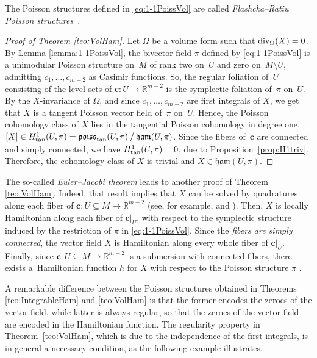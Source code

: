 \documentclass[pdftex]{sigma}%
\newcommand{\R}[1]{\mathbb{R}^{#1}}
\numberwithin{equation}{section}
\begin{document}
\begin{Remark}
The Poisson structures defined in \eqref{eq:1-1PoissVol} are called \emph{Flashcka--Ratiu Poisson structures}~\cite{Damianou-2012}.
\end{Remark}

\begin{proof}[Proof of Theorem \ref{teo:VolHam}]
Let $\Omega$ be a volume form such that ${\rm div}_{\Omega}(X)=0$. By Lemma \ref{lemma:1-1PoissVol}, the bivector field $\pi$ defined by \eqref{eq:1-1PoissVol} is a unimodular Poisson structure on~$M$ of rank two on~$U$ and zero on~$M \setminus U$, admitting $c_1,\dots,c_{m-2}$ as Casimir functions. So, the regular foliation of~$U$ consisting of the level sets of $\boldsymbol{c}\colon U \to \R{m-2}$ is the symplectic foliation of~$\pi$ on~$U$. By the $X$-invariance of $\Omega$, and since $c_1,\dots,c_{m-2}$ are first integrals of $X$, we get that $X$ is a tangent Poisson vector field of~$\pi$ on~$U$. Hence, the Poisson cohomology class of $X$ lies in the tangential Poisson cohomology in degree one, $[X] \in H^{1}_{{\rm tan}}(U,\pi) = {\mathfrak{poiss}_{{\rm tan}}(U,\pi)} \,\big/\, {\mathfrak{ham}(U,\pi)}$. Since the fibers of~$\boldsymbol{c}$ are connected and simply connected, we have $H^{1}_{{\rm tan}}(U,\pi)=0$, due to Proposition~\ref{prop:H1triv}. Therefore, the cohomology class of $X$ is trivial and $X\in\mathfrak{ham}(U,\pi)$.
\end{proof}

\begin{Remark}
The so-called \emph{Euler--Jacobi theorem} leads to another proof of Theorem \ref{teo:VolHam}. Indeed, that result implies that $X$ can be solved by quadratures along each fiber of $\boldsymbol{c}\colon U \subseteq M \to \R{m-2}$ (see, for example, \cite{BBM-11} and \cite[Theorem 1]{Kozlov-85}). Then, $X$ is locally Hamiltonian along each fiber of $\boldsymbol{c}|_{U}$, with respect to the symplectic structure induced by the restriction of $\pi$ in \eqref{eq:1-1PoissVol}. Since the \emph{fibers are simply connected}, the vector field $X$ is Hamiltonian along every whole fiber of $\boldsymbol{c}|_{U}$. Finally, since $\boldsymbol{c}\colon U\subseteq M \to \R{m-2}$ is a submersion with connected fibers, there exists a~Hamiltonian function $h$ for $X$ with respect to the Poisson structure $\pi$ \cite[Proposition~7.4]{DazHec-91}.
\end{Remark}

A remarkable difference between the Poisson structures obtained in Theorems \ref{teo:IntegrableHam} and \ref{teo:VolHam} is that the former encodes the zeroes of the vector field, while latter is always regular, so that the zeroes of the vector field are encoded in the Hamiltonian function. The regularity property in Theorem~\ref{teo:VolHam}, which is due to the independence of the first integrals, is in general a necessary condition, as the following example illustrates.
\end{document}
